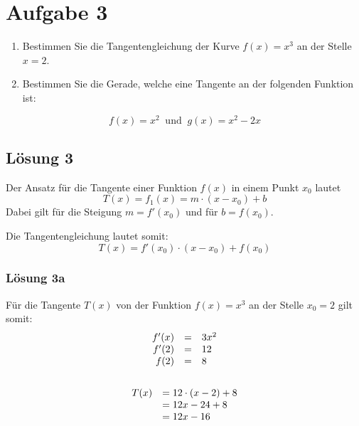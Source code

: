 \documentclass[main.tex]{subfiles}
\begin{document}
\section{Aufgabe 3}
\begin{enumerate}
    \item Bestimmen Sie die Tangentengleichung der Kurve $f(x) = x^3$ an der Stelle $x=2$.
    \item Bestimmen Sie die Gerade, welche eine Tangente an der folgenden Funktion ist:
\end{enumerate}

\begin{equation*}
    f(x) = x^2 \ \text{ und }\ g(x) = x^2-2x
\end{equation*}

\subsection{Lösung 3}
Der Ansatz für die Tangente einer Funktion $f( x)$ in einem Punkt $x_{0}$ lautet
\begin{equation*}
    T( x) =f_{1}( x) =m\cdotp ( x-x_{0}) +b
\end{equation*}
Dabei gilt für die Steigung $m=f'( x_{0})$ und für $b=f( x_{0})$.

Die Tangentengleichung lautet somit:
\begin{equation*}
    T( x) =f'( x_{0}) \cdotp ( x-x_{0}) +f( x_{0})
\end{equation*}

\subsubsection*{Lösung 3a}
Für die Tangente $T( x)$ von der Funktion $f( x) =x^{3}$ an der Stelle $x_{0} =2$ gilt somit:
\begin{gather*}
    \begin{array}{ r c l }
    f'( x) & = & 3x^{2}\\
    f'( 2) & = & 12\\
    f( 2) & = & 8
    \end{array}\\
    \\
    \begin{array}{ c l }
    T( x) & =12\cdotp ( x-2) +8\\
    & =12x-24+8\\
    & =12x-16
    \end{array}
\end{gather*}
\end{document}
